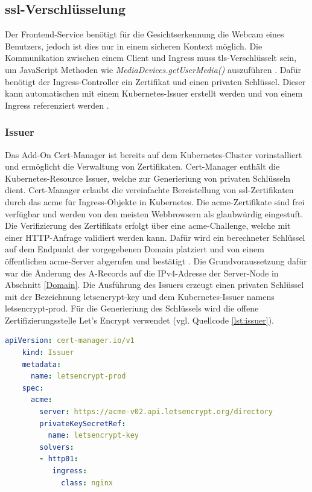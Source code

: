 \subsection{\acs{ssl}-Verschlüsselung}

Der Frontend-Service benötigt für die Gesichtserkennung die Webcam eines Benutzers, jedoch ist dies nur in einem sicheren Kontext möglich.
Die Kommunikation zwischen einem Client und Ingress muss \acs{tls}-Verschlüsselt sein, um JavaScript Methoden wie \textit{MediaDevices.getUserMedia()} auszuführen \cite{MediaDevicesgetUserMedia}.
Dafür benötigt der Ingress-Controller ein Zertifikat und einen privaten Schlüssel.
Dieser kann automatischen mit einem Kubernetes-Issuer erstellt werden und von einem Ingress referenziert werden \cite{certmanager}.

\subsubsection{Issuer}
Das Add-On Cert-Manager ist bereits auf dem Kubernetes-Cluster vorinstalliert und ermöglicht die Verwaltung von Zertifikaten.
Cert-Manager enthält die Kubernetes-Resource Issuer, welche zur Generieriung von privaten Schlüsseln dient.
Cert-Manager erlaubt die vereinfachte Bereistellung von \ac{ssl}-Zertifikaten durch das \ac{acme} für Ingress-Objekte in Kubernetes.
Die \acs{acme}-Zertifikate sind frei verfügbar und werden von den meisten Webbrowsern als glaubwürdig eingestuft.
Die Verifizierung des Zertifikats erfolgt über eine \acs{acme}-Challenge, welche mit einer HTTP-Anfrage validiert werden kann.
Dafür wird ein berechneter Schlüssel auf dem Endpunkt der vorgegebenen Domain platziert und von einem öffentlichen \acs{acme}-Server abgerufen und bestätigt \cite{certmanageracme}.
Die Grundvoraussetzung dafür war die Änderung des A-Records auf die IPv4-Adresse der Server-Node in Abschnitt \ref{Domain}.
Die Ausführung des Issuers erzeugt einen privaten Schlüssel mit der Bezeichnung letsencrypt-key und dem Kubernetes-Issuer namens letsencrypt-prod. 
Für die Generieriung des Schlüssels wird die offene Zertifizierungsstelle Let's Encrypt verwendet \cite{letsencrypt} (vgl. Quellcode \ref{lst:issuer}). 

\begin{lstlisting}[caption={issuer.yaml \cite{certmanageracme} },captionpos=b,label={lst:issuer},language=yaml]
    apiVersion: cert-manager.io/v1
    kind: Issuer
    metadata:
      name: letsencrypt-prod
    spec:
      acme:
        server: https://acme-v02.api.letsencrypt.org/directory
        privateKeySecretRef:
          name: letsencrypt-key
        solvers:
        - http01:
           ingress:
             class: nginx

\end{lstlisting}




